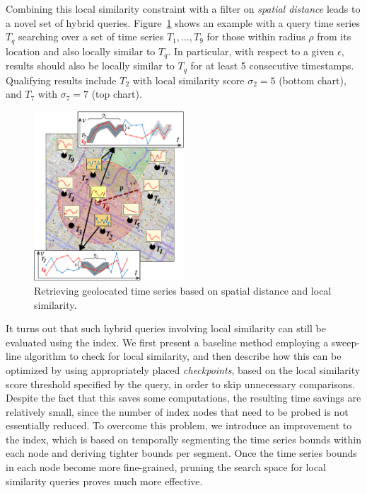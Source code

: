 Combining this local similarity constraint with a filter on {\em spatial distance} leads to a novel set of hybrid queries. Figure~\ref{fig:example_query} shows an example with a query time series $T_q$ searching over a set of time series $T_1,\dots,T_9$ for those within radius $\rho$ from its location and also locally similar to $T_q$. In particular, with respect to a given $\epsilon$, results should also be locally similar to $T_q$ for at least 5 consecutive timestamps. Qualifying results include $T_2$ with local similarity score $\sigma_2 = 5$ (bottom chart), and $T_7$ with $\sigma_7 = 7$ (top chart).

\begin{figure}[!tb]
 \centering
 \includegraphics[width=0.5\textwidth]{Figures/local_sim_geoloc.png}
\caption{Retrieving geolocated time series based on spatial distance and local similarity.}
\label{fig:example_query}
\end{figure}

It turns out that such hybrid queries involving local similarity can still be evaluated using the \btsr index. We first present a baseline method employing a sweep-line algorithm to check for local similarity, and then describe how this can be optimized by using appropriately placed {\em checkpoints}, based on the local similarity score threshold specified by the query, in order to skip unnecessary comparisons. Despite the fact that this saves some computations, the resulting time savings are relatively small, since the number of index nodes that need to be probed is not essentially reduced. To overcome this problem, we introduce an improvement to the \btsr index, which is based on temporally segmenting the time series bounds within each node and deriving tighter bounds per segment. Once the time series bounds in each node become more fine-grained, pruning the search space for local similarity queries proves much more effective.

